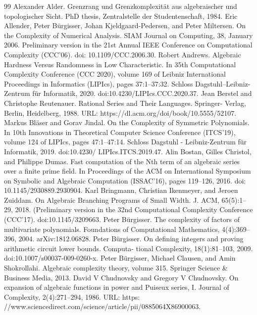 \begin{thebibliography}{99}
 Alexander Alder. Grenzrang und Grenzkomplexität aus algebraischer und topologischer Sicht. PhD thesis, Zentralstelle der Studentenschaft, 1984.
 Eric Allender, Peter Bürgisser, Johan Kjeldgaard-Pedersen, and Peter Miltersen. On the Complexity of Numerical Analysis. SIAM Journal on Computing, 38, January 2006. Preliminary version in the 21st Annual IEEE Conference on Computational Complexity (CCC’06). doi: 10.1109/CCC.2006.30.
 Robert Andrews. Algebraic Hardness Versus Randomness in Low Characteristic. In 35th Computational Complexity Conference (CCC 2020), volume 169 of Leibniz International Proceedings in Informatics (LIPIcs), pages 37:1–37:32. Schloss Dagstuhl–Leibniz-Zentrum für Informatik, 2020. doi:10.4230/LIPIcs.CCC.2020.37.
 Jean Berstel and Christophe Reutenauer. Rational Series and Their Languages. Springer- Verlag, Berlin, Heidelberg, 1988. URL: https://dl.acm.org/doi/book/10.5555/52107.
 Markus Bläser and Gorav Jindal. On the Complexity of Symmetric Polynomials. In 10th Innovations in Theoretical Computer Science Conference (ITCS’19), volume 124 of LIPIcs, pages 47:1–47:14. Schloss Dagstuhl - Leibniz-Zentrum für Informatik, 2019. doi:10.4230/ LIPIcs.ITCS.2019.47.
 Alin Bostan, Gilles Christol, and Philippe Dumas. Fast computation of the Nth term of an algebraic series over a finite prime field. In Proceedings of the ACM on International Symposium on Symbolic and Algebraic Computation (ISSAC’16), pages 119–126, 2016. doi: 10.1145/2930889.2930904.
 Karl Bringmann, Christian Ikenmeyer, and Jeroen Zuiddam. On Algebraic Branching Programs of Small Width. J. ACM, 65(5):1–29, 2018. (Preliminary version in the 32nd Computational Complexity Conference (CCC’17). doi:10.1145/3209663.
 Peter Bürgisser. The complexity of factors of multivariate polynomials. Foundations of Computational Mathematics, 4(4):369–396, 2004. arXiv:1812.06828.
 Peter Bürgisser. On defining integers and proving arithmetic circuit lower bounds. Computa- tional Complexity, 18(1):81–103, 2009. doi:10.1007/s00037-009-0260-x.
 Peter Bürgisser, Michael Clausen, and Amin Shokrollahi. Algebraic complexity theory, volume 315. Springer Science \& Business Media, 2013.
 David V Chudnovsky and Gregory V Chudnovsky. On expansion of algebraic functions in power and Puiseux series, I. Journal of Complexity, 2(4):271–294, 1986. URL: https: //www.sciencedirect.com/science/article/pii/0885064X86900063.

\end{thebibliography}

